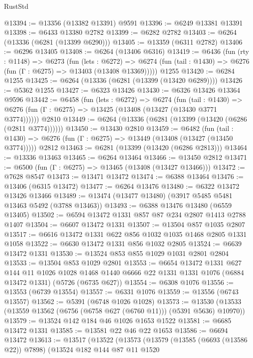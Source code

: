 \begin{lexlean}{RustStd}
\begin{coremodule}
@13394 := @13356 (@13382 @13391) @9591
@13396 := @6249 @13381 @13391
@13398 := @6433 @13380 @2782
@13399 := @6282 @2782
@13403 := @6264 (@13336 (@6281 (@13399 @6290)))
@13405 := @13359 (@6311 @2782)
@13406 := @6296 @13405
@13408 := @6264 (@13406 @6316)
@13419 := @6436
    (fun (rty : @1148) =>
    @6273
      (fun (lets : @6272) =>
      @6274 (fun (tail : @1430) => @6276 (fun (Γ : @6275) => @13403 (@13408 @13369)))))
    @1255
@13420 := @6284 @1255
@13425 := @6264 (@13336 (@6281 (@13399 (@13420 @6289))))
@13426 := @5362 @1255
@13427 := @6323 @13426
@13430 := @6326 @13426 @13364 @9596
@13442 := @6458
    (fun (lets : @6272) =>
    @6274
      (fun (tail : @1430) =>
      @6276 (fun (Γ : @6275) => @13425 (@13408 (@13427 (@13430 @3771 @3774))))))
    @2810
@13449 := @6264 (@13336 (@6281 (@13399 (@13420 (@6286 (@2811 @3774))))))
@13450 := @13430 @2810
@13459 := @6482
    (fun (tail : @1430) => @6276 (fun (Γ : @6275) => @13449 (@13408 (@13427 (@13450 @3774)))))
    @2812
@13463 := @6281 (@13399 (@13420 (@6286 @2813)))
@13464 := @13336 @13463
@13465 := @6264 @13464
@13466 := @13450 @2812
@13471 := @6500 (fun (Γ : @6275) => @13465 (@13408 (@13427 @13466)))
@13472 := @7628 @8547
@13473 := @13471 @13472
@13474 := @6388 @13464
@13476 := @13406 (@6315 @13472)
@13477 := @6264 @13476
@13480 := @6322 @13472 @13426 @13466
@13489 := @13474 (@13477 @13480) (@3917 @5485 @5481 @13463 @5492 (@3788 @13463))
@13493 := @6388 @13476 @13480 (@6559 @13405)
@13502 := @6594 @13472 @1331 @857 @87 @234 @2807 @1413 @2788 @1407
@13504 := @6607 @13472 @1331
@13507 := @13504 @857 @1035 @2807
@13517 := @6616 @13472 @1331 @622 @856 @1032 @1035 @1468 @2805 @1331 @1058
@13522 := @6630 @13472 @1331 @856 @1032 @2805
@13524 := @6639 @13472 @1331
@13530 := @13524 @853 @855 @1029 @1031 @2801 @2804
@13533 := @13504 @853 @1029 @2801
@13553 := @6654
    @13472
    @1331
    @627
    @144
    @11
    @1026
    @1028
    @1468
    @1440
    @6666
    @22
    @1331
    @1331
    @1076
    (@6884 @13472 @1331)
    (@5726 (@6735 @627))
@13554 := @6308 @1076
@13556 := @13553 (@6739 @13554)
@13557 := @6331 @1076
@13559 := @13556 (@6743 @13557)
@13562 := @5391 (@6748 @1026 @1028)
@13573 := @13530 (@13533 (@13559 @13562 (@6756 (@6758 @627 (@6760 @11))) (@5391 @5636) @10970))
@13579 := @13524 @142 @184 @46 @1026 @1653 @1522
@13581 := @6685 @13472 @1331
@13585 := @13581 @22 @46 @22 @1653
@13586 := @6694 @13472
@13613 := @13517
    (@13522
      (@13573
        (@13579
          (@13585 (@6693 (@13586 @22)) @7898)
          (@13524
            @182
            @144
            @87
            @11
            @1520

\end{coremodule}
\end{lexlean}
